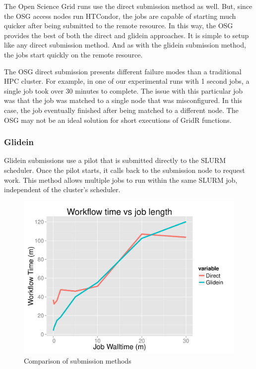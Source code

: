 The Open Science Grid runs use the direct submission method as well.  But, since the OSG access nodes run HTCondor, the jobs are capable of starting much quicker after being submitted to the remote resource.  In this way, the OSG provides the best of both the direct and glidein approaches.  It is simple to setup like any direct submission method.  And as with the glidein submission method, the jobs start quickly on the remote resource.

The OSG direct submission presents different failure modes than a traditional HPC cluster.  For example, in one of our experimental runs with 1 second jobs, a single job took over 30 minutes to complete.  The issue with this particular job was that the job was matched to a single node that was misconfigured.  In this case, the job eventually finished after being matched to a different node.  The OSG may not be an ideal solution for short executions of GridR functions.

\subsubsection{Glidein}
Glidein submissions use a pilot that is submitted directly to the SLURM scheduler.  Once the pilot starts, it calls back to the submission node to request work.  This method allows multiple jobs to run within the same SLURM job, independent of the cluster's scheduler.  

\begin{figure}[h!t]
\centering
\includegraphics[width=\textwidth]{BoscoRImages/ComparisonPlot.pdf}
\caption{Comparison of submission methods}
\label{fig:comparesubmit}
\end{figure}

